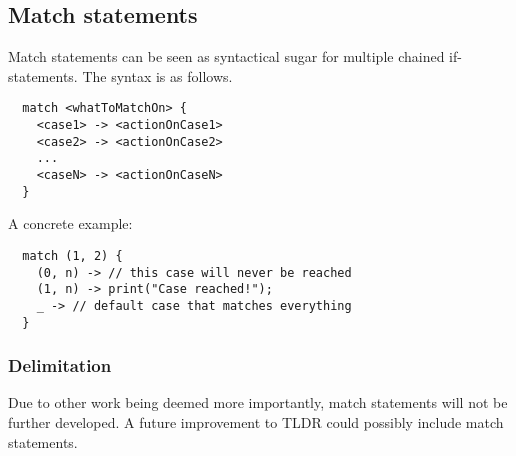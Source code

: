 \subsection{Match statements}
\label{subsec:matchStatements}

Match statements can be seen as syntactical sugar for multiple chained if-statements. The syntax is as follows.

\begin{verbatim}
  match <whatToMatchOn> {
    <case1> -> <actionOnCase1>
    <case2> -> <actionOnCase2>
    ...
    <caseN> -> <actionOnCaseN>
  }
\end{verbatim}

A concrete example:

\begin{verbatim}
  match (1, 2) {
    (0, n) -> // this case will never be reached
    (1, n) -> print("Case reached!");
    _ -> // default case that matches everything
  }
\end{verbatim}

\subsubsection{Delimitation}

Due to other work being deemed more importantly, match statements will not be further developed. A future improvement to TLDR could possibly include match statements.
